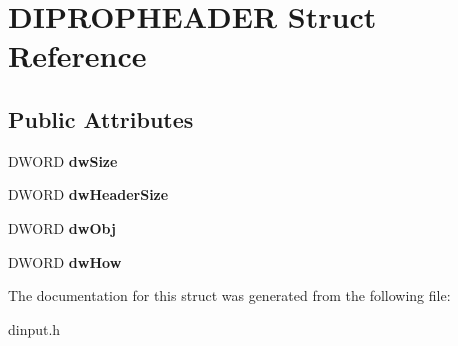 \hypertarget{struct_d_i_p_r_o_p_h_e_a_d_e_r}{\section{D\-I\-P\-R\-O\-P\-H\-E\-A\-D\-E\-R Struct Reference}
\label{struct_d_i_p_r_o_p_h_e_a_d_e_r}
}
\subsection*{Public Attributes}
\begin{DoxyCompactItemize}
\item 
\hypertarget{struct_d_i_p_r_o_p_h_e_a_d_e_r_a38d34f23793a152d13067921f8583b30}{D\-W\-O\-R\-D {\bfseries dw\-Size}}\label{struct_d_i_p_r_o_p_h_e_a_d_e_r_a38d34f23793a152d13067921f8583b30}

\item 
\hypertarget{struct_d_i_p_r_o_p_h_e_a_d_e_r_ac637a7839438133dc9f2bb48a5bfd598}{D\-W\-O\-R\-D {\bfseries dw\-Header\-Size}}\label{struct_d_i_p_r_o_p_h_e_a_d_e_r_ac637a7839438133dc9f2bb48a5bfd598}

\item 
\hypertarget{struct_d_i_p_r_o_p_h_e_a_d_e_r_a15246b889cf543916b09e864c12f6254}{D\-W\-O\-R\-D {\bfseries dw\-Obj}}\label{struct_d_i_p_r_o_p_h_e_a_d_e_r_a15246b889cf543916b09e864c12f6254}

\item 
\hypertarget{struct_d_i_p_r_o_p_h_e_a_d_e_r_af285da4392d38e2b00a2d6a9204e66b1}{D\-W\-O\-R\-D {\bfseries dw\-How}}\label{struct_d_i_p_r_o_p_h_e_a_d_e_r_af285da4392d38e2b00a2d6a9204e66b1}

\end{DoxyCompactItemize}


The documentation for this struct was generated from the following file\-:\begin{DoxyCompactItemize}
\item 
dinput.\-h\end{DoxyCompactItemize}
